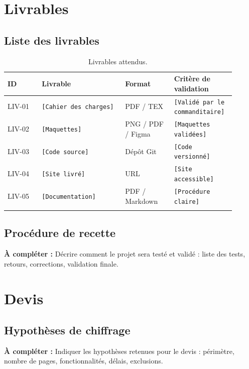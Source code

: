 \documentclass[11pt,a4paper]{report}
\newcommand{\placeholder}[1]{\textcolor{placeholderColor}{\texttt{[#1]}}}
\newcommand{\todo}[1]{\textcolor{todoColor}{\textbf{À compléter :} #1}}
\newcommand{\blankspace}[1]{\vspace*{#1}}
\begin{document}
\chapter{Livrables}

\section{Liste des livrables}
\begin{longtable}{p{0.14\linewidth}p{0.34\linewidth}p{0.20\linewidth}p{0.22\linewidth}}
\toprule
\textbf{ID} & \textbf{Livrable} & \textbf{Format} & \textbf{Critère de validation} \\
\midrule
\endhead
LIV-01 & \placeholder{Cahier des charges} & PDF / TEX & \placeholder{Validé par le commanditaire} \\
LIV-02 & \placeholder{Maquettes} & PNG / PDF / Figma & \placeholder{Maquettes validées} \\
LIV-03 & \placeholder{Code source} & Dépôt Git & \placeholder{Code versionné} \\
LIV-04 & \placeholder{Site livré} & URL & \placeholder{Site accessible} \\
LIV-05 & \placeholder{Documentation} & PDF / Markdown & \placeholder{Procédure claire} \\
\bottomrule
\caption{Livrables attendus.}
\label{tab:livrables}
\end{longtable}

\section{Procédure de recette}
\todo{Décrire comment le projet sera testé et validé : liste des tests, retours, corrections, validation finale.}
\blankspace{7cm}

\chapter{Devis}

\section{Hypothèses de chiffrage}
\todo{Indiquer les hypothèses retenues pour le devis : périmètre, nombre de pages, fonctionnalités, délais, exclusions.}
\blankspace{5cm}
\end{document}

